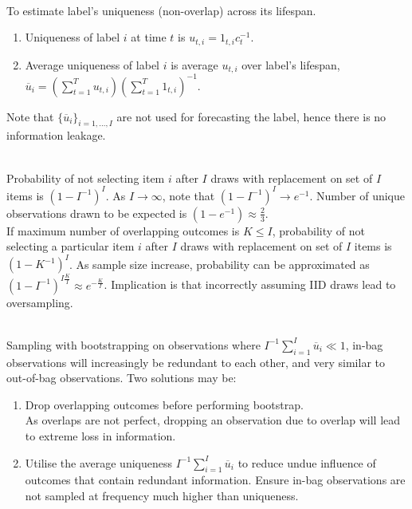 \documentclass[a4paper,oneside,openany]{book}
\begin{document}
\begin{method} \\
To estimate label's uniqueness (non-overlap) across its lifespan.
\begin{enumerate}[label=\roman*.]
\setlength{\itemsep}{0pt}
\item Uniqueness of label $i$ at time $t$ is $u_{t,i} = 1_{t,i} c^{-1}_{t}$.
\item Average uniqueness of label $i$ is average $u_{t,i}$ over label's lifespan, $\overline{u}_i = (\sum_{t=1}^T u_{t,i}) (\sum_{t=1}^T 1_{t,i})^{-1}$.
\end{enumerate}
Note that $\{\overline{u}_{i}\}_{i=1, \ldots, I}$ are not used for forecasting the label, hence there is no information leakage.
\end{method}

\begin{remark} \\
Probability of not selecting item $i$ after $I$ draws with replacement on set of $I$ items is $(1 - I^{-1})^I$. As $I \rightarrow \infty$, note that $(1 - I^{-1})^I \rightarrow e^{-1}$. Number of unique observations drawn to be expected is $(1- e^{-1}) \approx \frac{2}{3}$.\\
If maximum number of overlapping outcomes is $K \leq I$, probability of not selecting a particular item $i$ after $I$ draws with replacement on set of $I$ items is $(1 - K^{-1})^I$. As sample size increase, probability can be approximated as $(1-I^{-1})^{I \frac{K}{I}} \approx e^{-\frac{K}{I}}$. Implication is that incorrectly assuming IID draws lead to oversampling.
\end{remark}

\begin{method} \\
Sampling with bootstrapping on observations where $I^{-1} \sum_{i=1}^{I} \overline{u}_i \ll 1$, in-bag observations will increasingly be redundant to each other, and very similar to out-of-bag observations. Two solutions may be:
\begin{enumerate}[label=\roman*.]
\setlength{\itemsep}{0pt}
\item Drop overlapping outcomes before performing bootstrap.\\
As overlaps are not perfect, dropping an observation due to overlap will lead to extreme loss in information.
\item Utilise the average uniqueness $I^{-1} \sum_{i=1}^{I} \overline{u}_i$ to reduce undue influence of outcomes that contain redundant information. Ensure in-bag observations are not sampled at frequency much higher than uniqueness.
\end{enumerate}
\end{method}
\end{document}
